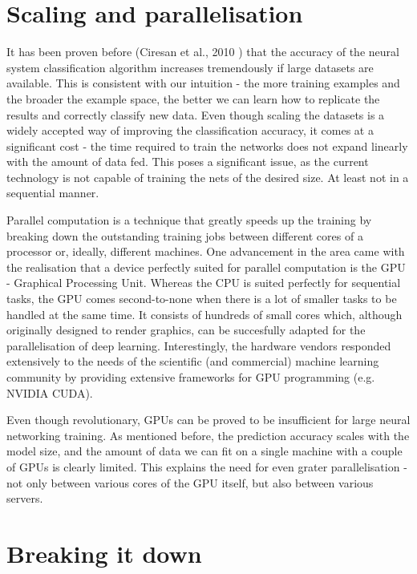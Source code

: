 \documentclass[a4paper, 12pt]{article}
\numberwithin{equation}{section}
\begin{document}
	\section{Scaling and parallelisation}
	
	It has been proven before (Ciresan et al., 2010 \cite{ciresan2010deep}) that the accuracy of the neural system classification algorithm increases tremendously if large datasets are available. This is consistent with our intuition - the more training examples and the broader the example space, the better we can learn how to replicate the results and correctly classify new data. Even though scaling the datasets is a widely accepted way of improving the classification accuracy, it comes at a significant cost - the time required to train the networks does not expand linearly with the amount of data fed. This poses a significant issue, as the current technology is not capable of training the nets of the desired size. At least not in a sequential manner.
	
	Parallel computation is a technique that greatly speeds up the training by breaking down the outstanding training jobs between different cores of a processor or, ideally, different machines. One advancement in the area came with the realisation that a device perfectly suited for parallel computation is the GPU - Graphical Processing Unit. Whereas the CPU is suited perfectly for sequential tasks, the GPU comes second-to-none when there is a lot of smaller tasks to be handled at the same time. It consists of hundreds of small cores which, although originally designed to render graphics, can be succesfully adapted for the parallelisation of deep learning. Interestingly, the hardware vendors responded extensively to the needs of the scientific (and commercial) machine learning community by providing extensive frameworks for GPU programming (e.g. NVIDIA CUDA).
	
	Even though revolutionary, GPUs can be proved to be insufficient for large neural networking training. As mentioned before, the prediction accuracy scales with the model size, and the amount of data we can fit on a single machine with a couple of GPUs is clearly limited. This explains the need for even grater parallelisation - not only between various cores of the GPU itself, but also between various servers. 
	
	\section{Breaking it down}
	\label{breakingitdown}
	
\end{document}
